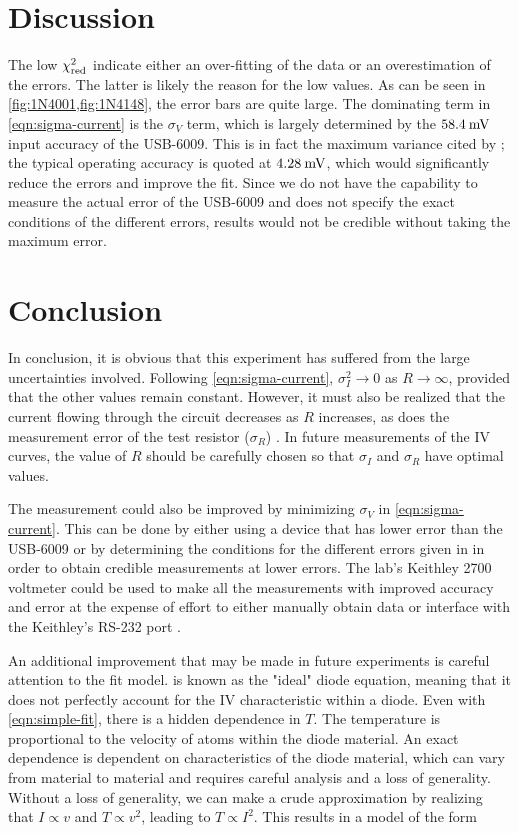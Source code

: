 \documentclass[reprint]{revtex4-1}
\begin{document}
\section{Discussion}

The low $\chi^2_{\rm{red}}$ indicate either an over-fitting of the data or an overestimation of the errors. The latter is likely the reason for the low values. As can be seen in \cref{fig:1N4001,fig:1N4148}, the error bars are quite large. The dominating term in \cref{eqn:sigma-current} is the $\sigma_V$ term, which is largely determined by the $58.4\:\rm{mV}$ input accuracy of the USB-6009. This is in fact the maximum variance cited by \cite{Instruments2014}; the typical operating accuracy is quoted at $4.28\:\rm{mV}$, which would significantly reduce the errors and improve the fit. Since we do not have the capability to measure the actual error of the USB-6009 and \cite{Instruments2014} does not specify the exact conditions of the different errors, results would not be credible without taking the maximum error.

\section{Conclusion}

In conclusion, it is obvious that this experiment has suffered from the large uncertainties involved. Following \cref{eqn:sigma-current}, $\sigma_I^2 \to 0$ as $R \to \infty$, provided that the other values remain constant. However, it must also be realized that the current flowing through the circuit decreases as $R$ increases, as does the measurement error of the test resistor ($\sigma_R$) \cite{Keithley2003}. In future measurements of the IV curves, the value of $R$ should be carefully chosen so that $\sigma_I$ and $\sigma_R$ have optimal values.

The measurement could also be improved by minimizing $\sigma_V$ in \cref{eqn:sigma-current}. This can be done by either using a device that has lower error than the USB-6009 or by determining the conditions for the different errors given in \cite{Instruments2014} in order to obtain credible measurements at lower errors. The lab's Keithley 2700 voltmeter could be used to make all the measurements with improved accuracy and error at the expense of effort to either manually obtain data or interface with the Keithley's RS-232 port \cite{Keithley2003}.

An additional improvement that may be made in future experiments is careful attention to the fit model.  is known as the "ideal" diode equation, meaning that it does not perfectly account for the IV characteristic within a diode. Even with \cref{eqn:simple-fit}, there is a hidden dependence in $T$. The temperature is proportional to the velocity of atoms within the diode material. An exact dependence is dependent on characteristics of the diode material, which can vary from material to material and requires careful analysis and a loss of generality. Without a loss of generality, we can make a crude approximation by realizing that $I \propto v$ and $T \propto v^2$, leading to $T \propto I^2$. This results in a model of the form
\end{document}
